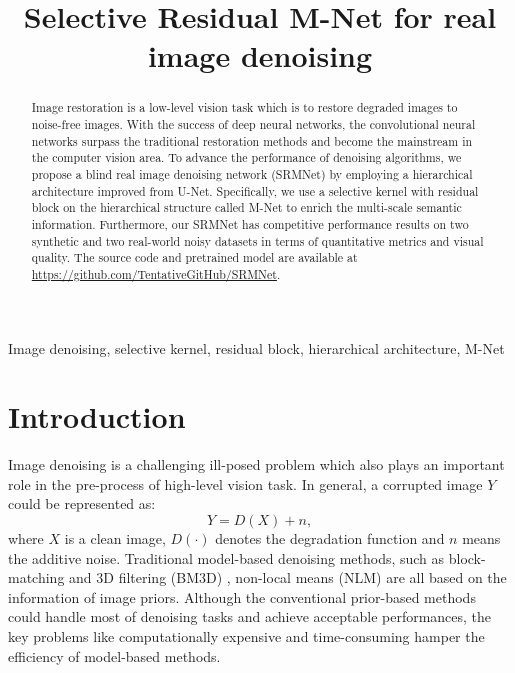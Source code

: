\documentclass{article}
\begin{document}
\sloppy

\def\x{{\mathbf x}}
\def\L{{\cal L}}

\title{Selective Residual M-Net for real image denoising}


\address{
\ninept $^{\star}$Department of Electrical Engineering and Graduate Institute of Communication Engineering, National Chung Hsing University, Taiwan
\\
\ninept $^{\dagger}$Department of Computer Science and Information Engineering, National Taichung University of Science and Technology, Taiwan
}

\maketitle

\begin{abstract}
Image restoration is a low-level vision task which is to restore degraded images to noise-free images. With the success of deep neural networks, the convolutional neural networks surpass the traditional restoration methods and become the mainstream in the computer vision area. To advance the performance of denoising algorithms, we propose a blind real image denoising network (SRMNet) by employing a hierarchical architecture improved from U-Net. Specifically, we use a selective kernel with residual block on the hierarchical structure called M-Net to enrich the multi-scale semantic information. Furthermore, our SRMNet has competitive performance results on two synthetic and two real-world noisy datasets in terms of quantitative metrics and visual quality. The source code and pretrained model are available at \url{https://github.com/TentativeGitHub/SRMNet}.
\end{abstract}
\begin{keywords}
Image denoising, selective kernel, residual block, hierarchical architecture, M-Net
\end{keywords}
\section{Introduction}

Image denoising is a challenging ill-posed problem which also plays an important role in the pre-process of high-level vision task. In general, a corrupted image $Y$ could be represented as: 
\begin{equation}
Y = D(X) + n, \label{eq1}
\end{equation}
where $X$ is a clean image, $D(\cdot)$ denotes the degradation function and $n$ means the additive noise. Traditional model-based denoising methods, such as block-matching and 3D filtering (BM3D) \cite{01}, non-local means (NLM) \cite{02} are all based on the information of image priors. Although the conventional prior-based methods could handle most of denoising tasks and achieve acceptable performances, the key problems like computationally expensive and time-consuming hamper the efficiency of model-based methods. 
\end{document}
